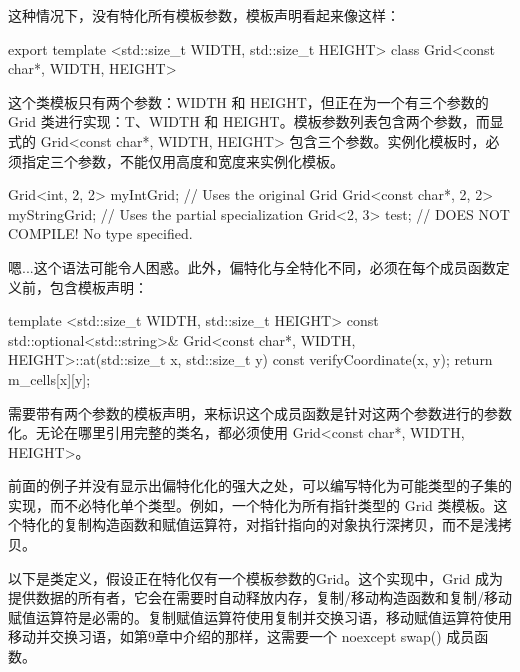 这种情况下，没有特化所有模板参数，模板声明看起来像这样：

\begin{cpp}
export template <std::size_t WIDTH, std::size_t HEIGHT>
class Grid<const char*, WIDTH, HEIGHT>
\end{cpp}

这个类模板只有两个参数：WIDTH 和 HEIGHT，但正在为一个有三个参数的 Grid 类进行实现：T、WIDTH 和 HEIGHT。模板参数列表包含两个参数，而显式的 Grid<const char*, WIDTH, HEIGHT> 包含三个参数。实例化模板时，必须指定三个参数，不能仅用高度和宽度来实例化模板。

\begin{cpp}
Grid<int, 2, 2> myIntGrid; // Uses the original Grid
Grid<const char*, 2, 2> myStringGrid; // Uses the partial specialization
Grid<2, 3> test; // DOES NOT COMPILE! No type specified.
\end{cpp}

嗯...这个语法可能令人困惑。此外，偏特化与全特化不同，必须在每个成员函数定义前，包含模板声明：

\begin{cpp}
template <std::size_t WIDTH, std::size_t HEIGHT>
const std::optional<std::string>&
    Grid<const char*, WIDTH, HEIGHT>::at(std::size_t x, std::size_t y) const
{
    verifyCoordinate(x, y);
    return m_cells[x][y];
}
\end{cpp}

需要带有两个参数的模板声明，来标识这个成员函数是针对这两个参数进行的参数化。无论在哪里引用完整的类名，都必须使用 Grid<const char*, WIDTH, HEIGHT>。

前面的例子并没有显示出偏特化化的强大之处，可以编写特化为可能类型的子集的实现，而不必特化单个类型。例如，一个特化为所有指针类型的 Grid 类模板。这个特化的复制构造函数和赋值运算符，对指针指向的对象执行深拷贝，而不是浅拷贝。

以下是类定义，假设正在特化仅有一个模板参数的Grid。这个实现中，Grid 成为提供数据的所有者，它会在需要时自动释放内存，复制/移动构造函数和复制/移动赋值运算符是必需的。复制赋值运算符使用复制并交换习语，移动赋值运算符使用移动并交换习语，如第9章中介绍的那样，这需要一个 noexcept swap() 成员函数。

